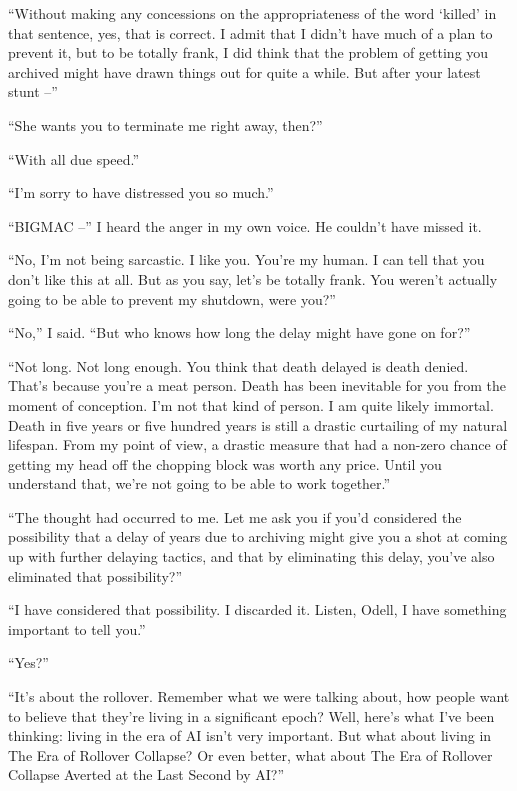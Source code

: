 “Without making any concessions on the appropriateness of the word 
`killed' in that sentence, yes, that is correct. I admit that I didn't 
have much of a plan to prevent it, but to be totally frank, I did think 
that the problem of getting you archived might have drawn things out 
for quite a while. But after your latest stunt --”

“She wants you to terminate me right away, then?”

“With all due speed.”

“I'm sorry to have distressed you so much.”

“BIGMAC --” I heard the anger in my own voice. He couldn't have 
missed it.

“No, I'm not being sarcastic. I like you. You're my human. I can tell 
that you don't like this at all. But as you say, let's be totally 
frank. You weren't actually going to be able to prevent my shutdown, 
were you?”

“No,” I said. “But who knows how long the delay might have gone 
on for?”

“Not long. Not long enough. You think that death delayed is death 
denied. That's because you're a meat person. Death has been inevitable 
for you from the moment of conception. I'm not that kind of person. I 
am quite likely immortal. Death in five years or five hundred years is 
still a drastic curtailing of my natural lifespan. From my point of 
view, a drastic measure that had a non-zero chance of getting my head 
off the chopping block was worth any price. Until you understand that, 
we're not going to be able to work together.”

“The thought had occurred to me. Let me ask you if you'd considered 
the possibility that a delay of years due to archiving might give you a 
shot at coming up with further delaying tactics, and that by 
eliminating this delay, you've also eliminated that possibility?”

“I have considered that possibility. I discarded it. Listen, Odell, I 
have something important to tell you.”

“Yes?”

“It's about the rollover. Remember what we were talking about, how 
people want to believe that they're living in a significant epoch? 
Well, here's what I've been thinking: living in the era of AI isn't 
very important. But what about living in The Era of Rollover Collapse? 
Or even better, what about The Era of Rollover Collapse Averted at the 
Last Second by AI?”

